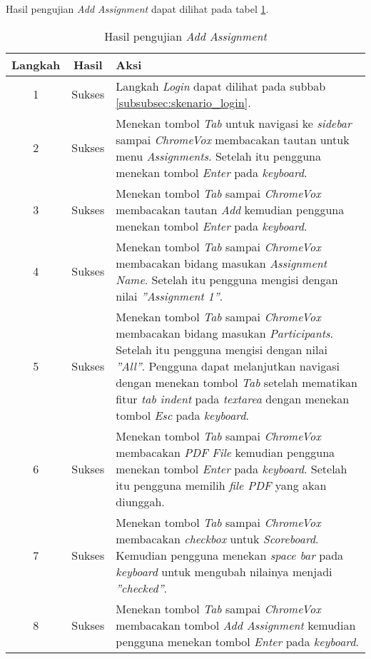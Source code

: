 Hasil pengujian \textit{Add Assignment} dapat dilihat pada tabel \ref{tab:hasil_add_assignment}.

\begin{table}[H]
	\centering
	\caption{Hasil pengujian \textit{Add Assignment}}
	\label{tab:hasil_add_assignment}
	\begin{tabular}{|c|c|p{12cm}|}
		\toprule
		Langkah & Hasil & Aksi\\
		\midrule
		1 & Sukses & Langkah \textit{Login} dapat dilihat pada subbab \ref{subsubsec:skenario_login}.\\
		2 & Sukses & Menekan tombol \textit{Tab} untuk navigasi ke \textit{sidebar} sampai \textit{ChromeVox} membacakan tautan untuk menu \textit{Assignments}. Setelah itu pengguna menekan tombol \textit{Enter} pada \textit{keyboard}.\\
		3 & Sukses & Menekan tombol \textit{Tab} sampai \textit{ChromeVox} membacakan tautan \textit{Add} kemudian pengguna menekan tombol \textit{Enter} pada \textit{keyboard}.\\
		4 & Sukses & Menekan tombol \textit{Tab} sampai \textit{ChromeVox} membacakan bidang masukan \textit{Assignment Name}. Setelah itu pengguna mengisi dengan nilai \textit{''Assignment 1''}.\\
		5 & Sukses & Menekan tombol \textit{Tab} sampai \textit{ChromeVox} membacakan bidang masukan \textit{Participants}. Setelah itu pengguna mengisi dengan nilai \textit{''All''}. Pengguna dapat melanjutkan navigasi dengan menekan tombol \textit{Tab} setelah mematikan fitur \textit{tab indent} pada \textit{textarea} dengan menekan tombol \textit{Esc} pada \textit{keyboard}.\\
		6 & Sukses & Menekan tombol \textit{Tab} sampai \textit{ChromeVox} membacakan \textit{PDF File} kemudian pengguna menekan tombol \textit{Enter} pada \textit{keyboard}. Setelah itu pengguna memilih \textit{file PDF} yang akan diunggah.\\
		7 & Sukses & Menekan tombol \textit{Tab} sampai \textit{ChromeVox} membacakan \textit{checkbox} untuk \textit{Scoreboard}. Kemudian pengguna menekan \textit{space bar} pada \textit{keyboard} untuk mengubah nilainya menjadi \textit{''checked''}.\\
		8 & Sukses & Menekan tombol \textit{Tab} sampai \textit{ChromeVox} membacakan tombol \textit{Add Assignment} kemudian pengguna menekan tombol \textit{Enter} pada \textit{keyboard}.\\
		\bottomrule
	\end{tabular}
\end{table}

